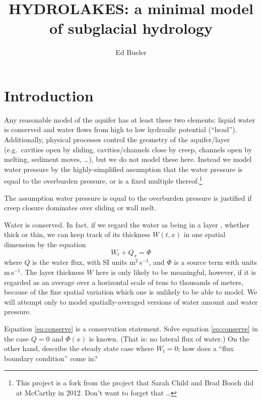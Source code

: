 \documentclass[12pt,final]{amsart}%
\title[]{HYDROLAKES:  a minimal model of subglacial hydrology}
\author[]{Ed Bueler}
\begin{document}
\maketitle

\thispagestyle{empty}


\section{Introduction} 

Any reasonable model of the aquifer has at least these two elements: liquid water is conserved and water flows from high to low hydraulic potential (``head'').  Additionally, physical processes control the geometry of the aquifer/layer (e.g.~cavities open by sliding, cavities/channels close by creep, channels open by melting, sediment moves, \dots), but we do not model these here.  Instead we model water pressure by the highly-simplified assumption that the water pressure is equal to the overburden pressure, or is a fixed multiple thereof.\footnote{This project is a fork from the project that Sarah Child and Brad Booch did at McCarthy in 2012.  Don't want to forget that \dots}

The assumption water pressure is equal to the overburden pressure is justified if creep closure dominates over sliding or wall melt.

Water is conserved.  In fact, if we regard the water as being in a layer \citep{Clarke05}, whether thick or thin, we can keep track of its thickness $W(t,x)$ in one spatial dimension by the equation
\begin{equation} \label{eq:conserve}
W_t + Q_x = \Phi
\end{equation}
where $Q$ is the water flux, with SI units $\text{m}^2\,\text{s}^{-1}$, and $\Phi$ is a source term with units $\text{m}\,\text{s}^{-1}$.  The layer thickness $W$ here is only likely to be meaningful, however, if it is regarded as an average over a horizontal scale of tens to thousands of meters, because of the fine spatial variation which one is unlikely to be able to model.  We will attempt only to model spatially-averaged versions of water amount and water pressure.

Equation \eqref{eq:conserve} is a conservation statement.  Solve equation \eqref{eq:conserve} in the case $Q=0$ and $\Phi(x)$ is known.  (That is: no lateral flux of water.)  On the other hand, describe the steady state case where $W_t=0$; how does a ``flux boundary condition'' come in?
\end{document}
